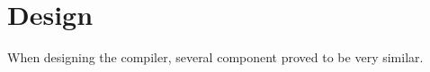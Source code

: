 \section{Design}
\label{sec:design}

When designing the \lang{} compiler, several component proved to be very similar. 


